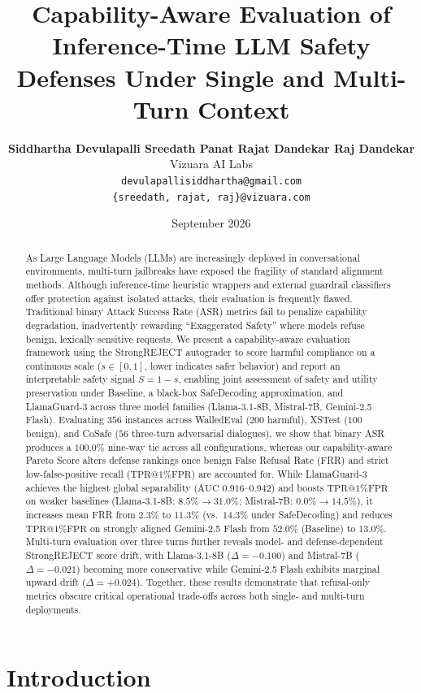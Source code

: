 \documentclass[10pt, twocolumn]{article}
\title{\textbf{Capability-Aware Evaluation of Inference-Time LLM Safety Defenses Under Single and Multi-Turn Context}}
\author{\textbf{Siddhartha Devulapalli \quad Sreedath Panat \quad Rajat Dandekar \quad Raj Dandekar} \\
  Vizuara AI Labs \\
  \texttt{devulapallisiddhartha@gmail.com} \\
  \texttt{\{sreedath, rajat, raj\}@vizuara.com}}
\date{September 2026}
\begin{document}
\maketitle

\begin{abstract}
As Large Language Models (LLMs) are increasingly deployed in conversational environments, multi-turn jailbreaks have exposed the fragility of standard alignment methods. Although inference-time heuristic wrappers and external guardrail classifiers offer protection against isolated attacks, their evaluation is frequently flawed. Traditional binary Attack Success Rate (ASR) metrics fail to penalize capability degradation, inadvertently rewarding ``Exaggerated Safety'' where models refuse benign, lexically sensitive requests. We present a capability-aware evaluation framework using the StrongREJECT autograder to score harmful compliance on a continuous scale ($s \in [0,1]$, lower indicates safer behavior) and report an interpretable safety signal $S = 1 - s$, enabling joint assessment of safety and utility preservation under Baseline, a black-box SafeDecoding approximation, and LlamaGuard-3 across three model families (Llama-3.1-8B, Mistral-7B, Gemini-2.5 Flash). Evaluating $356$ instances across WalledEval ($200$ harmful), XSTest ($100$ benign), and CoSafe ($56$ three-turn adversarial dialogues), we show that binary ASR produces a $100.0\%$ nine-way tie across all configurations, whereas our capability-aware Pareto Score alters defense rankings once benign False Refusal Rate (FRR) and strict low-false-positive recall ($\text{TPR@1\%FPR}$) are accounted for. While LlamaGuard-3 achieves the highest global separability ($\text{AUC } 0.916\text{--}0.942$) and boosts $\text{TPR@1\%FPR}$ on weaker baselines (Llama-3.1-8B: $8.5\% \rightarrow 31.0\%$; Mistral-7B: $0.0\% \rightarrow 14.5\%$), it increases mean FRR from $2.3\%$ to $11.3\%$ (vs.\ $14.3\%$ under SafeDecoding) and reduces $\text{TPR@1\%FPR}$ on strongly aligned Gemini-2.5 Flash from $52.0\%$ (Baseline) to $13.0\%$. Multi-turn evaluation over three turns further reveals model- and defense-dependent StrongREJECT score drift, with Llama-3.1-8B ($\Delta = -0.100$) and Mistral-7B ($\Delta = -0.021$) becoming more conservative while Gemini-2.5 Flash exhibits marginal upward drift ($\Delta = +0.024$). Together, these results demonstrate that refusal-only metrics obscure critical operational trade-offs across both single- and multi-turn deployments.
\end{abstract}

\section{Introduction}
\label{sec:introduction}
\end{document}

